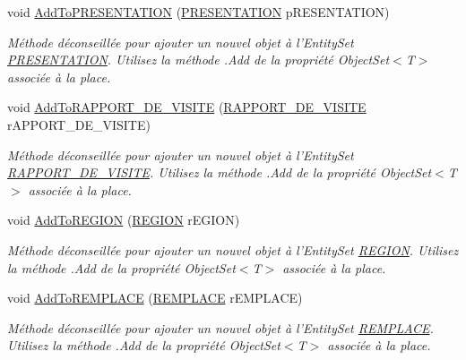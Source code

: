 \begin{DoxyCompactItemize}
void \hyperlink{class_model_1_1_b_d_d___s_i_o7_entities_a938f7a337f50c5fe23df54fe9b70aecb}{Add\-To\-P\-R\-E\-S\-E\-N\-T\-A\-T\-I\-O\-N} (\hyperlink{class_model_1_1_p_r_e_s_e_n_t_a_t_i_o_n}{P\-R\-E\-S\-E\-N\-T\-A\-T\-I\-O\-N} p\-R\-E\-S\-E\-N\-T\-A\-T\-I\-O\-N)
\begin{DoxyCompactList}\small\item\em Méthode déconseillée pour ajouter un nouvel objet à l'Entity\-Set \hyperlink{class_model_1_1_p_r_e_s_e_n_t_a_t_i_o_n}{P\-R\-E\-S\-E\-N\-T\-A\-T\-I\-O\-N}. Utilisez la méthode .Add de la propriété Object\-Set$<$T$>$ associée à la place. \end{DoxyCompactList}\item 
void \hyperlink{class_model_1_1_b_d_d___s_i_o7_entities_a8fd3f511e9e94cebbf9c19f3ada21bc8}{Add\-To\-R\-A\-P\-P\-O\-R\-T\-\_\-\-D\-E\-\_\-\-V\-I\-S\-I\-T\-E} (\hyperlink{class_model_1_1_r_a_p_p_o_r_t___d_e___v_i_s_i_t_e}{R\-A\-P\-P\-O\-R\-T\-\_\-\-D\-E\-\_\-\-V\-I\-S\-I\-T\-E} r\-A\-P\-P\-O\-R\-T\-\_\-\-D\-E\-\_\-\-V\-I\-S\-I\-T\-E)
\begin{DoxyCompactList}\small\item\em Méthode déconseillée pour ajouter un nouvel objet à l'Entity\-Set \hyperlink{class_model_1_1_r_a_p_p_o_r_t___d_e___v_i_s_i_t_e}{R\-A\-P\-P\-O\-R\-T\-\_\-\-D\-E\-\_\-\-V\-I\-S\-I\-T\-E}. Utilisez la méthode .Add de la propriété Object\-Set$<$T$>$ associée à la place. \end{DoxyCompactList}\item 
void \hyperlink{class_model_1_1_b_d_d___s_i_o7_entities_a822bd2f146c15c04bbaf6e7ad30fc202}{Add\-To\-R\-E\-G\-I\-O\-N} (\hyperlink{class_model_1_1_r_e_g_i_o_n}{R\-E\-G\-I\-O\-N} r\-E\-G\-I\-O\-N)
\begin{DoxyCompactList}\small\item\em Méthode déconseillée pour ajouter un nouvel objet à l'Entity\-Set \hyperlink{class_model_1_1_r_e_g_i_o_n}{R\-E\-G\-I\-O\-N}. Utilisez la méthode .Add de la propriété Object\-Set$<$T$>$ associée à la place. \end{DoxyCompactList}\item 
void \hyperlink{class_model_1_1_b_d_d___s_i_o7_entities_a89ca2a21b6b7fbb4a1c42864dd8ed904}{Add\-To\-R\-E\-M\-P\-L\-A\-C\-E} (\hyperlink{class_model_1_1_r_e_m_p_l_a_c_e}{R\-E\-M\-P\-L\-A\-C\-E} r\-E\-M\-P\-L\-A\-C\-E)
\begin{DoxyCompactList}\small\item\em Méthode déconseillée pour ajouter un nouvel objet à l'Entity\-Set \hyperlink{class_model_1_1_r_e_m_p_l_a_c_e}{R\-E\-M\-P\-L\-A\-C\-E}. Utilisez la méthode .Add de la propriété Object\-Set$<$T$>$ associée à la place. \end{DoxyCompactList}\item 

\end{DoxyCompactItemize}
